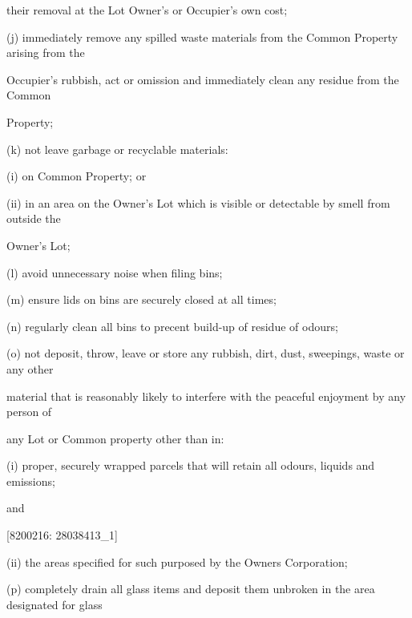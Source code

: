 \documentclass{article}
\begin{document}
{\fontsize{10.02}{1}their removal at the Lot Owner’s or Occupier’s own cost; }

{\fontsize{9.962}{1}(j) immediately remove any spilled waste materials from the Common Property arising from the }

{\fontsize{10.02}{1}Occupier’s rubbish, act or omission and immediately clean any residue from the Common }

{\fontsize{10.02}{1}Property; }

{\fontsize{9.962}{1}(k) not leave garbage or recyclable materials: }

{\fontsize{9.962}{1}(i) on Common Property; or }

{\fontsize{9.962}{1}(ii) in an area on the Owner’s Lot which is visible or detectable by smell from outside the }

{\fontsize{10.02}{1}Owner’s Lot; }

{\fontsize{9.962}{1}(l) avoid unnecessary noise when filing bins; }

{\fontsize{9.962}{1}(m) ensure lids on bins are securely closed at all times; }

{\fontsize{9.962}{1}(n) regularly clean all bins to precent build-up of residue of odours; }

{\fontsize{9.962}{1}(o) not deposit, throw, leave or store any rubbish, dirt, dust, sweepings, waste or any other }

{\fontsize{10.02}{1}material that is reasonably likely to interfere with the peaceful enjoyment by any person of }

{\fontsize{10.02}{1}any Lot or Common property other than in: }

{\fontsize{9.962}{1}(i) proper, securely wrapped parcels that will retain all odours, liquids and emissions; }

{\fontsize{10.02}{1}and }

\newpage
















{\fontsize{7.02}{1}[8200216: 28038413\_1] }

{\fontsize{9.962}{1}(ii) the areas specified for such purposed by the Owners Corporation; }

{\fontsize{9.962}{1}(p) completely drain all glass items and deposit them unbroken in the area designated for glass }
\end{document}
